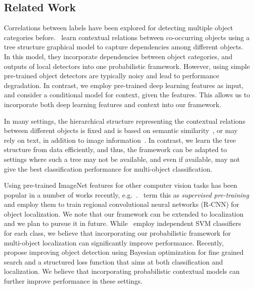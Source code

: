 \documentclass{article}
\begin{document}
 \subsection{Related Work}




Correlations between labels have been explored for detecting multiple object categories before.~\cite{myungjin,outofcontext} learn contextual relations between co-occurring objects using a tree structure graphical model   to capture dependencies among different objects. In this model, they incorporate  dependencies between object categories, and outputs of local detectors into one probabilistic framework.   However, using simple pre-trained object detectors   are typically noisy and lead to performance degradation. In contrast, we employ pre-trained deep learning features as input, and consider a conditional model for context, given the features. This allows us to incorporate both deep learning features and context into our framework.


In many settings, the hierarchical structure representing the contextual relations between different objects is fixed and is based on semantic similarity~\cite{grauman2011learning}, or may rely on text, in addition to image information~\cite{li2010building}. In contrast, we learn the tree structure from data efficiently, and thus, the framework can be adapted to settings where such a tree may not be available, and even if available, may not give the best classification performance for multi-object classification.


Using pre-trained ImageNet features for other computer vision tasks has been popular in a number of works recently, e.g.~\cite{transferable,girshick2014rich,oquab2014learning}.~\cite{girshick2014rich} term this as {\em supervised pre-training} and employ them to train regional convolutional neural networks (R-CNN) for object localization. We note that our framework can be extended to
localization and we plan to pursue it in future.  While~\cite{girshick2014rich} employ independent SVM classifiers for each class, we believe that incorporating our probabilistic framework for multi-object localization can significantly improve performance.
Recently,~\cite{zhang2015improving} propose improving object detection using Bayesian optimization for fine grained search and a structured loss function that aims at both classification and localization. We believe that incorporating probabilistic contextual models can further improve performance in these settings.
\end{document}
